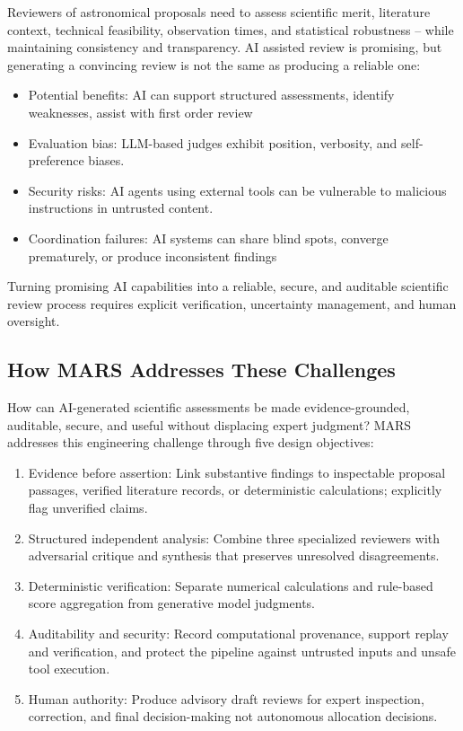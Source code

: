 \documentclass[11pt,twoside]{article}
\begin{document}
Reviewers of astronomical proposals need to assess scientific merit, literature context, technical feasibility, observation times, and statistical robustness – while maintaining consistency and transparency. AI assisted review is promising, but generating a convincing review is not the same as producing a reliable one:
\begin{itemize}
\item Potential benefits: AI can support structured assessments, identify weaknesses, assist with first order review
\item Evaluation bias: LLM-based judges exhibit position, verbosity, and self-preference biases.
\item Security risks: AI agents using external tools can be vulnerable to malicious instructions in untrusted content. 
\item Coordination failures: AI systems can share blind spots, converge prematurely, or produce inconsistent findings
\end{itemize}

Turning promising AI capabilities into a reliable, secure, and auditable scientific review process requires explicit verification, uncertainty management, and human oversight.

\subsection{How MARS Addresses These Challenges}

How can AI-generated scientific assessments be made evidence-grounded, auditable, secure, and useful without displacing expert judgment?
MARS addresses this engineering challenge through five design objectives:
\begin{enumerate}
\item Evidence before assertion: Link substantive findings to inspectable proposal passages, verified literature records, or deterministic calculations; explicitly flag unverified claims. 
\item Structured independent analysis: Combine three specialized reviewers with adversarial critique and synthesis that preserves unresolved disagreements. 
\item Deterministic verification: Separate numerical calculations and rule-based score aggregation from generative model judgments.
\item Auditability and security: Record computational provenance, support replay and verification, and protect the pipeline against untrusted inputs and unsafe tool execution.
\item Human authority: Produce advisory draft reviews for expert inspection, correction, and final decision-making not autonomous allocation decisions.
\end{enumerate}
\end{document}
